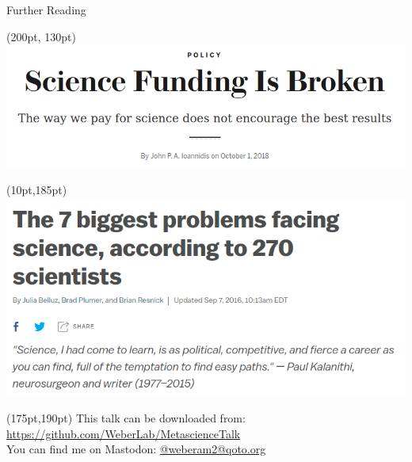 \documentclass{beamer}
\begin{document}
\begin{frame}{Further Reading}
	\begin{textblock*}{160pt}(200pt, 130pt)
		\includegraphics[width=1\textwidth]{../images/sciencefunding.png}
	\end{textblock*}

	\begin{textblock*}{140pt}(10pt,185pt)
		\includegraphics[width=1\textwidth]{../images/voxarticle.png}
	\end{textblock*}

	\begin{textblock*}{200pt}(175pt,190pt)
		This talk can be downloaded from: \url{https://github.com/WeberLab/MetascienceTalk}\\
		You can find me on Mastodon: \href{https://qoto.org/@weberam2}{@weberam2@qoto.org}
	\end{textblock*}

\end{frame}
\end{document}
